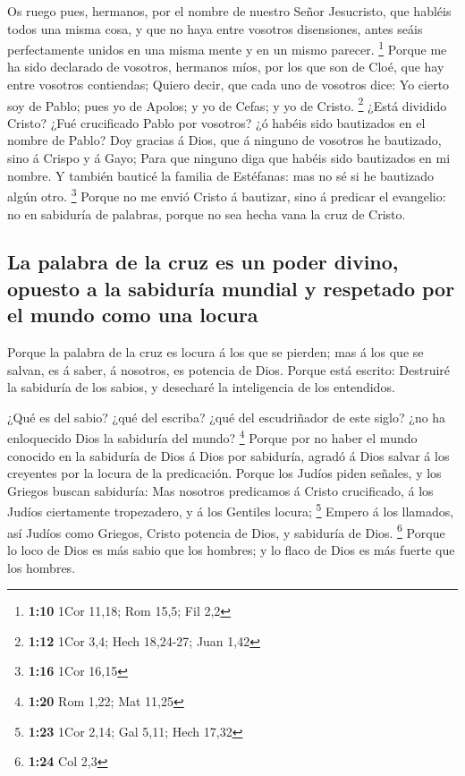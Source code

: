  Os ruego pues, hermanos, por el nombre de nuestro Señor
Jesucristo, que habléis todos una misma cosa, y que no haya entre
vosotros disensiones, antes seáis perfectamente unidos en una misma
mente y en un mismo parecer. \footnote{\textbf{1:10} 1Cor 11,18; Rom
  15,5; Fil 2,2}  Porque me ha sido declarado de vosotros,
hermanos míos, por los que son de Cloé, que hay entre vosotros
contiendas;  Quiero decir, que cada uno de vosotros dice:
Yo cierto soy de Pablo; pues yo de Apolos; y yo de Cefas; y yo de
Cristo. \footnote{\textbf{1:12} 1Cor 3,4; Hech 18,24-27; Juan 1,42}
 ¿Está dividido Cristo? ¿Fué crucificado Pablo por
vosotros? ¿ó habéis sido bautizados en el nombre de Pablo? 
Doy gracias á Dios, que á ninguno de vosotros he bautizado, sino á
Crispo y á Gayo;  Para que ninguno diga que habéis sido
bautizados en mi nombre.  Y también bauticé la familia de
Estéfanas: mas no sé si he bautizado algún otro. \footnote{\textbf{1:16}
  1Cor 16,15}  Porque no me envió Cristo á bautizar, sino á
predicar el evangelio: no en sabiduría de palabras, porque no sea hecha
vana la cruz de Cristo.

\hypertarget{la-palabra-de-la-cruz-es-un-poder-divino-opuesto-a-la-sabiduruxeda-mundial-y-respetado-por-el-mundo-como-una-locura}{%
\subsection{La palabra de la cruz es un poder divino, opuesto a la
sabiduría mundial y respetado por el mundo como una
locura}\label{la-palabra-de-la-cruz-es-un-poder-divino-opuesto-a-la-sabiduruxeda-mundial-y-respetado-por-el-mundo-como-una-locura}}

 Porque la palabra de la cruz es locura á los que se
pierden; mas á los que se salvan, es á saber, á nosotros, es potencia de
Dios.  Porque está escrito: Destruiré la sabiduría de los
sabios, y desecharé la inteligencia de los entendidos.

 ¿Qué es del sabio? ¿qué del escriba? ¿qué del escudriñador
de este siglo? ¿no ha enloquecido Dios la sabiduría del mundo?
\footnote{\textbf{1:20} Rom 1,22; Mat 11,25}  Porque por no
haber el mundo conocido en la sabiduría de Dios á Dios por sabiduría,
agradó á Dios salvar á los creyentes por la locura de la predicación.
 Porque los Judíos piden señales, y los Griegos buscan
sabiduría:  Mas nosotros predicamos á Cristo crucificado, á
los Judíos ciertamente tropezadero, y á los Gentiles locura; \footnote{\textbf{1:23}
  1Cor 2,14; Gal 5,11; Hech 17,32}  Empero á los llamados,
así Judíos como Griegos, Cristo potencia de Dios, y sabiduría de Dios.
\footnote{\textbf{1:24} Col 2,3}  Porque lo loco de Dios es
más sabio que los hombres; y lo flaco de Dios es más fuerte que los
hombres.

